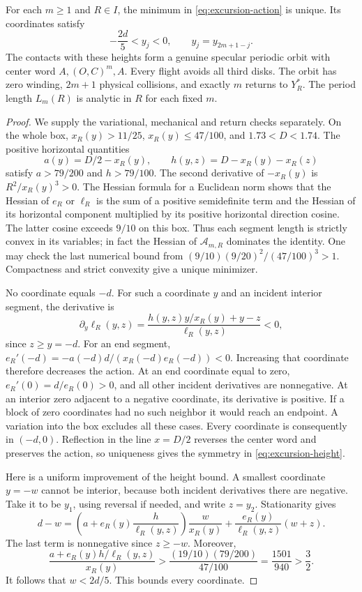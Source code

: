 \begin{lemma}\label{lem:excursion-family}
For each $m\ge1$ and $R\in I$, the minimum in
\eqref{eq:excursion-action} is unique. Its coordinates satisfy
\begin{equation}\label{eq:excursion-height}
 -\frac{2d}{5}<y_j<0,\qquad y_j=y_{2m+1-j}.
\end{equation}
The contacts with these heights form a genuine specular periodic orbit
with center word $A,(O,C)^m,A$. Every flight avoids all third disks.
The orbit has zero winding, $2m+1$ physical collisions, and exactly
$m$ returns to $Y_R^*$. The period length $L_m(R)$ is analytic in $R$
for each fixed $m$.
\end{lemma}
\begin{proof}
We supply the variational, mechanical and return checks separately.
On the whole box, $x_R(y)>11/25$, $x_R(y)\le47/100$, and
$1.73<D<1.74$. The positive horizontal quantities
\[
 a(y)=D/2-x_R(y),\qquad h(y,z)=D-x_R(y)-x_R(z)
\]
satisfy $a>79/200$ and $h>79/100$. The second derivative of
$-x_R(y)$ is $R^2/x_R(y)^3>0$. The Hessian formula for a Euclidean
norm shows that the Hessian of $e_R$ or $\ell_R$ is the sum of a
positive semidefinite term and the Hessian of its horizontal
component multiplied by its positive horizontal direction cosine.
The latter cosine exceeds $9/10$ on this box. Thus each segment
length is strictly convex in its variables; in fact the Hessian of
$\mathcal A_{m,R}$ dominates the identity. One may check the last
numerical bound from
$(9/10)(9/20)^2/(47/100)^3>1$. Compactness and strict convexity give
a unique minimizer.

No coordinate equals $-d$. For such a coordinate $y$ and an incident
interior segment, the derivative is
\[
 \partial_y\ell_R(y,z)=\frac{h(y,z)y/x_R(y)+y-z}{\ell_R(y,z)}<0,
\]
since $z\ge y=-d$. For an end segment,
$e_R'(-d)=-a(-d)d/(x_R(-d)e_R(-d))<0$.
Increasing that coordinate therefore decreases the action.
At an end coordinate equal to zero, $e_R'(0)=d/e_R(0)>0$, and
all other incident derivatives are nonnegative. At an interior zero
adjacent to a negative coordinate, its derivative is positive.
If a block of zero coordinates had no such neighbor it would reach
an endpoint. A variation into the box excludes all these cases.
Every coordinate is consequently in $(-d,0)$. Reflection in the
line $x=D/2$ reverses the center word and preserves the action, so
uniqueness gives the symmetry in \eqref{eq:excursion-height}.

Here is a uniform improvement of the height bound. A smallest
coordinate $y=-w$ cannot be interior, because both incident
derivatives there are negative. Take it to be $y_1$, using reversal
if needed, and write $z=y_2$. Stationarity gives
\[
 d-w=\left(a+e_R(y)\frac{h}{\ell_R(y,z)}\right)\frac{w}{x_R(y)}
           +\frac{e_R(y)}{\ell_R(y,z)}(w+z).
\]
The last term is nonnegative since $z\ge-w$. Moreover,
\[
 \frac{a+e_R(y)h/\ell_R(y,z)}{x_R(y)}
 >\frac{(19/10)(79/200)}{47/100}=\frac{1501}{940}>\frac32.
\]
It follows that $w<2d/5$. This bounds every coordinate.


\end{proof}
